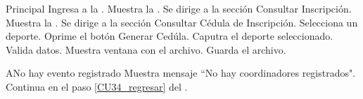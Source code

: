     \begin{UCtrayectoria}{Principal}
    \UCpaso[\UCactor] Ingresa a la .
    \UCpaso Muestra la .
    \UCpaso[\UCactor] Se dirige a la sección Consultar Inscripción.  
    \UCpaso Muestra la . \label{CU34_regresar}
    \UCpaso[\UCactor] Se dirige a la sección Consultar Cédula de Inscripción.
    \UCpaso[\UCactor] Selecciona un deporte.
    \UCpaso[\UCactor] Oprime el botón Generar Cedúla. 
    \UCpaso Caputra el deporte seleccionado.
    \UCpaso Valida datos. 
    \UCpaso Muestra ventana con el archivo.
    \UCpaso[\UCactor] Guarda el archivo. 
    \end{UCtrayectoria}
    
    \begin{UCtrayectoriaA}{A}{No hay evento registrado}
    	\UCpaso Muestra mensaje “No hay coordinadores registrados".
    	\UCpaso Continua en el paso \ref{CU34_regresar} del .
    \end{UCtrayectoriaA}


	


